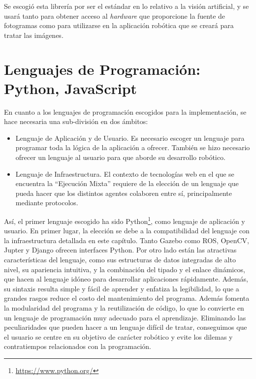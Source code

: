 Se escogió esta librería por ser el estándar en lo relativo a la visión artificial, y se usará tanto para obtener acceso al \textit{hardware} que proporcione la fuente de fotogramas como para utilizarse en la aplicación robótica que se creará para tratar las imágenes.

\section{Lenguajes de Programación: Python, JavaScript}

En cuanto a los lenguajes de programación escogidos para la implementación, se hace necesaria una sub-división en dos ámbitos:

\begin{itemize}
    \item Lenguaje de Aplicación y de Usuario. Es necesario escoger un lenguaje para programar toda la lógica de la aplicación a ofrecer. También se hizo necesario ofrecer un lenguaje al usuario para que aborde su desarrollo robótico.
    \item Lenguaje de Infraestructura. El contexto de tecnologías web en el que se encuentra la ``Ejecución Mixta'' requiere de la elección de un lenguaje que pueda hacer que los distintos agentes colaboren entre sí, principalmente mediante protocolos.
\end{itemize}

Así, el primer lenguaje escogido ha sido Python\footnote{\url{https://www.python.org/}}, como lenguaje de aplicación y usuario. En primer lugar, la elección se debe a la compatibilidad del lenguaje con la infraestructura detallada en este capítulo. Tanto Gazebo como ROS, OpenCV, Jupter y Django ofrecen interfaces Python. Por otro lado están las atractivas características del lenguaje, como sus estructuras de datos integradas de alto nivel, su apariencia intuitiva, y la combinación del tipado y el enlace dinámicos, que hacen al lenguaje idóneo para desarrollar aplicaciones rápidamente. Además, su sintaxis resulta simple y fácil de aprender y enfatiza la legibilidad, lo que a grandes rasgos reduce el costo del mantenimiento del programa. Además fomenta la modularidad del programa y la reutilización de código, lo que lo convierte en un lenguaje de programación muy adecuado para el aprendizaje. Eliminando las peculiaridades que pueden hacer a un lenguaje difícil de tratar, conseguimos que el usuario se centre en su objetivo de carácter robótico y evite los dilemas y contratiempos relacionados con la programación.

